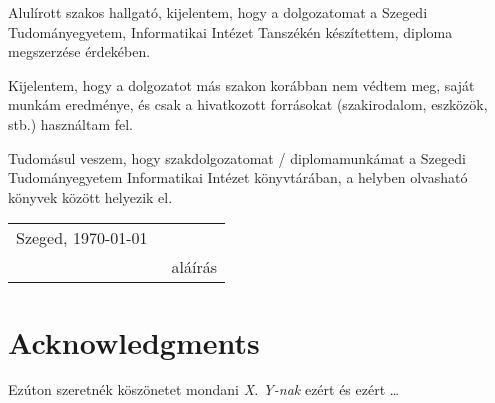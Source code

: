 \documentclass[12pt]{report}
\begin{document}


\noindent
Alulírott \makebox[4cm]{\dotfill} szakos hallgató, kijelentem, hogy a dolgozatomat a Szegedi Tudományegyetem, Informatikai Intézet \makebox[4cm]{\dotfill} Tanszékén készítettem, \makebox[4cm]{\dotfill} diploma megszerzése érdekében.

Kijelentem, hogy a dolgozatot más szakon korábban nem védtem meg, saját munkám eredménye, és csak a hivatkozott forrásokat (szakirodalom, eszközök, stb.) használtam fel.

Tudomásul veszem, hogy szakdolgozatomat / diplomamunkámat a Szegedi Tudományegyetem Informatikai Intézet könyvtárában, a helyben olvasható könyvek között helyezik el.

\vspace*{2cm}

\begin{tabular}{lc}
	Szeged, \today\
	\hspace{2cm} & \makebox[6cm]{\dotfill} \\
	& aláírás \\
\end{tabular}

\vspace*{4cm}

\chapter*{Acknowledgments}

Ezúton szeretnék köszönetet mondani \textit{X. Y-nak} ezért és ezért \ldots

 

\end{document}
